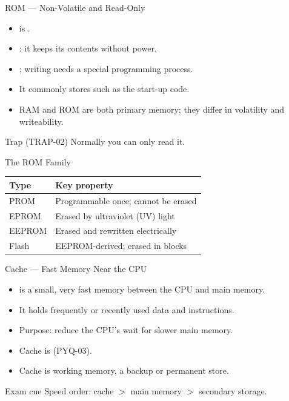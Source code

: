 \documentclass[aspectratio=169]{beamer}
\begin{document}
\begin{frame}{ROM --- Non-Volatile and Read-Only}
  \begin{itemize}
    \item {} is .
    \item {}: it keeps its contents without power.
    \item {}; writing needs a special
      programming process.
    \item It commonly stores  such as the start-up code.
    \item RAM and ROM are both primary memory; they differ in volatility and
      writeability.
  \end{itemize}
  \begin{alertblock}{Trap (TRAP-02)}
     Normally you can only read it.
  \end{alertblock}
\end{frame}

\begin{frame}{The ROM Family}
  \begin{center}
    \begin{tabular}{ll}
      \toprule
      \textbf{Type} & \textbf{Key property} \\
      \midrule
      PROM & Programmable once; cannot be erased \\
      EPROM & Erased by ultraviolet (UV) light \\
      EEPROM & Erased and rewritten electrically \\
      Flash & EEPROM-derived; erased in blocks \\
      \bottomrule
    \end{tabular}
  \end{center}
  \vspace{0.3cm}
\end{frame}

\begin{frame}{Cache --- Fast Memory Near the CPU}
  \begin{itemize}
    \item {} is a small, very fast memory between the CPU and main
      memory.
    \item It holds frequently or recently used data and instructions.
    \item Purpose: reduce the CPU's wait for slower main memory.
    \item Cache is  (PYQ-03).
    \item Cache is working memory,  a backup or permanent store.
  \end{itemize}
  \begin{block}{Exam cue}
    Speed order: cache $>$ main memory $>$ secondary storage.
  \end{block}
\end{frame}
\end{document}
